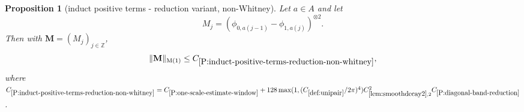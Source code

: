 \documentclass[12pt,reqno]{amsart}
\theoremstyle{plain}
\newtheorem{proposition}[theorem]{Proposition}
\numberwithin{equation}{section}
\theoremstyle{remark}
\newcommand{\uses}[1]{}
\newcommand{\usesdefs}[1]{}
\newcommand{\Z}{{\mathbb Z}}
\newcommand{\M}{\mathbf{M}}
\begin{document}
\begin{proposition}[induct positive terms - reduction variant, non-Whitney]
\label{P:induct-positive-terms-reduction-non-whitney}\uses{P:one-scale-estimate-window,L:fourier-transform-window,Operations on spaced sequences,lem:smoothdecay2,lem:scaleest,P:vanishing-diagonal-reduction,P:diagonal-band-reduction}\usesdefs{bracket bump,multiplicatively spaced monotone sequences,auto:unitary-matrices-definition,kernel sequences,def:cn-window,def:unipair}
Let $a\in A$ and let
\begin{equation}\label{auto:non-Whitney-kernel}M_j=({\phi}_{0,a(j-1)}-{\phi}_{1,a(j)})^{\otimes 2}.\end{equation}
Then with $\M=(M_j)_{j\in \Z}$,  \begin{equation}\label{auto:non-Whitney-reduction-bound}\|\M\|_{\rm M(1)}\le C_{\ref{P:induct-positive-terms-reduction-non-whitney}},\end{equation}
where $C_{\ref{P:induct-positive-terms-reduction-non-whitney}}=C_{\ref{P:one-scale-estimate-window}}+ 128 \max(1,(C_{\ref{def:unipair}}/2\pi)^4) C_{\ref{lem:smoothdecay2},2}^2C_{\ref{P:diagonal-band-reduction}}$.
\end{proposition}
\end{document}
